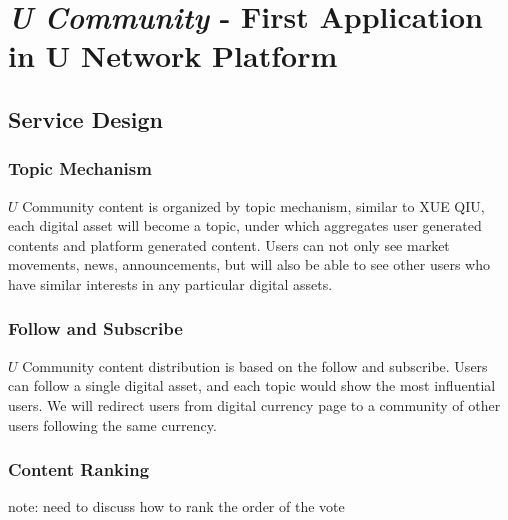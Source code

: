 \chapter{\emph{U Community} - First Application in U Network Platform}
\section{Service Design}
\subsection{Topic Mechanism}
$U$ Community content is organized by topic mechanism, similar to XUE QIU\cite{xueqiu}, each digital asset will become a topic, under which aggregates user generated contents and platform generated content. Users can not only see market movements, news, announcements, but will also be able to see other users who have similar interests in any particular digital assets. 
\subsection{Follow and Subscribe}
$U$ Community content distribution is based on the follow and subscribe. Users can follow a single digital asset, and each topic would show the most influential users. We will redirect users from digital currency page to a community of other users following the same currency. 
\subsection{Content Ranking}
{\color{red} note: need to discuss how to rank the order of the vote}


